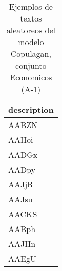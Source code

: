 \begin{table}[H]
\centering
\fontsize{8}{14}\selectfont
\caption{Ejemplos de textos aleatoreos del modelo Copulagan, conjunto Economicos (A-1)}
\label{table-sample10-economicos-a-1-copulagan-text}
\begin{tabular}{|m{50em}|}
\hline
\rowcolor[gray]{0.8}
description \\
\hline AABZN \\
\hline AAHoi \\
\hline AADGx \\
\hline AADpy \\
\hline AAJjR \\
\hline AAJsu \\
\hline AACKS \\
\hline AABph \\
\hline AAJHn \\
\hline AAEgU \\
\hline
\end{tabular}
\end{table}
